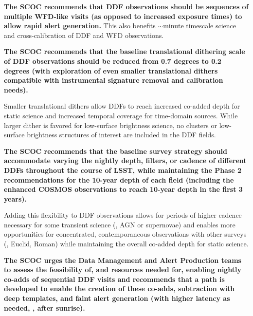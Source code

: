 
{\bf The SCOC recommends that DDF observations should be sequences of multiple WFD-like visits (as opposed to increased exposure times) to allow rapid alert generation.}
This also benefits $\sim$minute timescale science and cross-calibration of DDF and WFD observations. 

{\bf The SCOC recommends that the baseline translational dithering scale of DDF observations should be reduced from 0.7 degrees to 0.2 degrees (with exploration of even smaller translational dithers compatible with instrumental signature removal and calibration needs).
}

Smaller translational dithers allow DDFs to reach increased co-added depth for static science and increased temporal coverage for time-domain sources. While larger dither is favored for low-surface brightness science, no clusters or low-surface brightness structures of interest are included in the DDF fields.


{\bf The SCOC recommends that the baseline survey strategy should accommodate varying the nightly depth, filters, or cadence of different DDFs throughout the course of LSST, while maintaining the Phase 2 recommendations for the 10-year depth of each field (including the enhanced COSMOS observations to reach 10-year depth in the first 3 years).}

Adding this flexibility to DDF observations allows for periods of higher cadence necessary for some transient science (\eg , AGN or supernovae) and enables more opportunities for concentrated, contemporaneous observations with other surveys (\eg , Euclid, Roman) while maintaining the overall co-added depth for static science.

{\bf The SCOC urges the Data Management and Alert Production teams to assess the feasibility of, and resources needed for, enabling nightly co-adds of sequential DDF visits and recommends that a path is developed to enable the creation of these co-adds, subtraction with deep templates, and faint alert generation (with higher latency as needed, \eg , after sunrise). 
}

